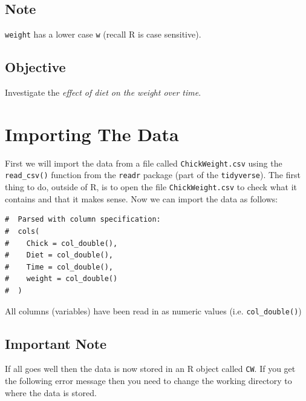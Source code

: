 \documentclass[a4paper,9pt,twocolumn,twoside,printwatermark=false]{pinp}
\begin{document}
\subsection{Note}\label{note}

\texttt{weight} has a lower case \texttt{w} (recall R is case
sensitive).

\subsection{Objective}\label{objective}

Investigate the \emph{effect of diet on the weight over time}.

\section{Importing The Data}\label{importing-the-data}

First we will import the data from a file called
\texttt{ChickWeight.csv} using the \texttt{read\_csv()} function from
the \texttt{readr} package (part of the \texttt{tidyverse}). The first
thing to do, outside of R, is to open the file \texttt{ChickWeight.csv}
to check what it contains and that it makes sense. Now we can import the
data as follows:

\begin{Shaded}
\begin{Highlighting}[]
\StringTok{ }\NormalTok{(}\NormalTok{)}
\end{Highlighting}
\end{Shaded}

\begin{ShadedResult}
\begin{verbatim}
#  Parsed with column specification:
#  cols(
#    Chick = col_double(),
#    Diet = col_double(),
#    Time = col_double(),
#    weight = col_double()
#  )
\end{verbatim}
\end{ShadedResult}

All columns (variables) have been read in as numeric values (i.e.
\texttt{col\_double()})

\subsection{Important Note}\label{important-note}

If all goes well then the data is now stored in an R object called
\texttt{CW}. If you get the following error message then you need to
change the working directory to where the data is stored.
\end{document}
